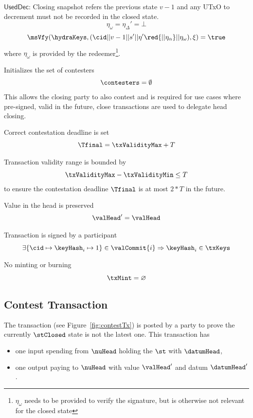 \begin{menumerate}
\begin{menumerate}
\[		\]
		\item $\mathsf{UsedDec}$: Closing snapshot refers the previous state $v - 1$ and any UTxO to decrement must not be recorded in the closed state.
		\[
	 		\eta_\omega = \eta_\Delta' = \bot
		\]
    \red{
		  \[
		  	\eta_\alpha = \bot
		  \]
    }
		\[
      \msVfy(\hydraKeys,(\cid || v - 1 || s' || \eta' \red{|| \eta_\alpha} || \eta_\omega),\xi) = \true
		\]
		where $\eta_\omega$ is provided by the redeemer\footnote{$\eta_\omega$ needs to be provided to verify the signature, but is otherwise not relevant for the closed state}.
	\end{menumerate}

	\item Initializes the set of contesters
	\[
		\contesters = \emptyset
	\]
	This allows the closing party to also contest and is required for use
	cases where pre-signed, valid in the future, close transactions are
	used to delegate head closing.

	\item Correct contestation deadline is set
	\[
		\Tfinal = \txValidityMax + T
	\]
	\item Transaction validity range is bounded by
	\[
		\txValidityMax - \txValidityMin \leq T
	\]
	to ensure the contestation deadline $\Tfinal$ is at most $2*T$ in the future.
	\item Value in the head is preserved
	\[
		\valHead' = \valHead
	\]
	\item Transaction is signed by a participant
	\[
		\exists \{\cid \mapsto \keyHash_{i} \mapsto 1\} \in \valCommit{i} \Rightarrow \keyHash_{i} \in \txKeys
	\]
	\item No minting or burning
	\[
		\txMint = \varnothing
	\]
\end{menumerate}

\subsection{Contest Transaction}\label{sec:contest-tx}

The \mtxContest{} transaction (see Figure~\ref{fig:contestTx}) is posted by a
party to prove the currently $\stClosed$ state is not the latest one. This
transaction has
\begin{itemize}
	\item one input spending from $\nuHead$ holding the $\st$ with $\datumHead$,
	\item one output paying to $\nuHead$ with value $\valHead'$ and
	      datum $\datumHead'$.
\end{itemize}


